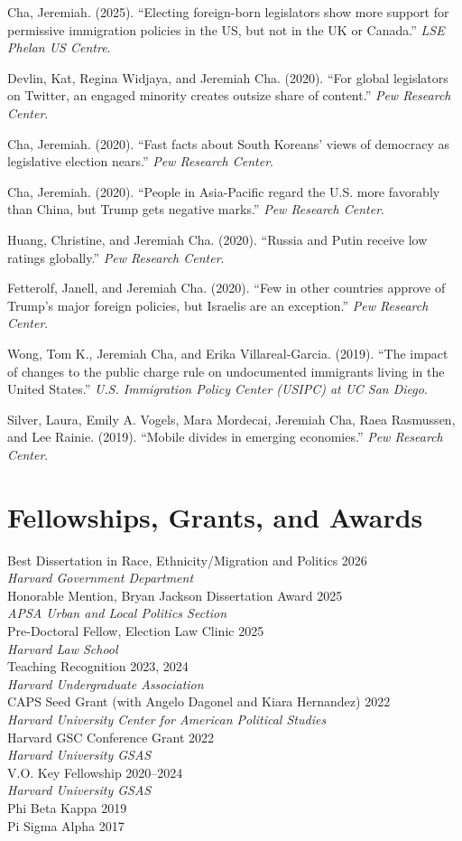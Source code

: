 \documentclass[11pt, letterpaper]{article}
\newcommand{\entry}[2]{\noindent #1 \hfill #2\\}
\newcommand{\subentry}[1]{\hspace*{1em}#1\\}
\begin{document}
\begin{etaremune}
    \item Cha, Jeremiah. (2025). ``Electing foreign-born legislators show more support for permissive immigration policies in the US, but not in the UK or Canada.'' \emph{LSE Phelan US Centre}.
    \item Devlin, Kat, Regina Widjaya, and Jeremiah Cha. (2020). ``For global legislators on Twitter, an engaged minority creates outsize share of content.'' \emph{Pew Research Center}.
    \item Cha, Jeremiah. (2020). ``Fast facts about South Koreans' views of democracy as legislative election nears.'' \emph{Pew Research Center}.
    \item Cha, Jeremiah. (2020). ``People in Asia-Pacific regard the U.S. more favorably than China, but Trump gets negative marks.'' \emph{Pew Research Center}.
    \item Huang, Christine, and Jeremiah Cha. (2020). ``Russia and Putin receive low ratings globally.'' \emph{Pew Research Center}.
    \item Fetterolf, Janell, and Jeremiah Cha. (2020). ``Few in other countries approve of Trump's major foreign policies, but Israelis are an exception.'' \emph{Pew Research Center}.
    \item Wong, Tom K., Jeremiah Cha, and Erika Villareal-Garcia. (2019). ``The impact of changes to the public charge rule on undocumented immigrants living in the United States.'' \emph{U.S. Immigration Policy Center (USIPC) at UC San Diego}.
    \item Silver, Laura, Emily A. Vogels, Mara Mordecai, Jeremiah Cha, Raea Rasmussen, and Lee Rainie. (2019). ``Mobile divides in emerging economies.'' \emph{Pew Research Center}.
\end{etaremune}

\section{Fellowships, Grants, and Awards}

\entry{Best Dissertation in Race, Ethnicity/Migration and Politics}{2026}
\subentry{\textit{Harvard Government Department}}
\entry{Honorable Mention, Bryan Jackson Dissertation Award}{2025}
\subentry{\textit{APSA Urban and Local Politics Section}}
\entry{Pre-Doctoral Fellow, Election Law Clinic}{2025}
\subentry{\textit{Harvard Law School}}
\entry{Teaching Recognition}{2023, 2024}
\subentry{\textit{Harvard Undergraduate Association}}
\entry{CAPS Seed Grant (with Angelo Dagonel and Kiara Hernandez)}{2022}
\subentry{\textit{Harvard University Center for American Political Studies}}
\entry{Harvard GSC Conference Grant}{2022}
\subentry{\textit{Harvard University GSAS}}
\entry{V.O. Key Fellowship}{2020--2024}
\subentry{\textit{Harvard University GSAS}}
\entry{Phi Beta Kappa}{2019}
\entry{Pi Sigma Alpha}{2017}
\end{document}
